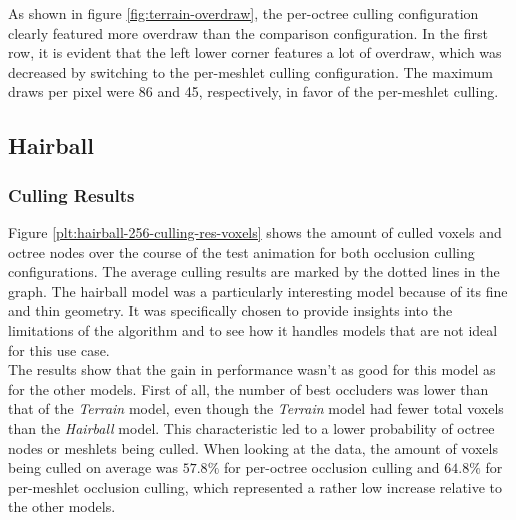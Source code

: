 \noindent
As shown in figure \ref{fig:terrain-overdraw}, the per-octree culling configuration clearly 
featured more overdraw than the comparison configuration. In the first row, it is evident that 
the left lower corner features a lot of overdraw, which was decreased by switching to the 
per-meshlet culling configuration. The maximum draws per pixel were 86 and 45, respectively, in 
favor of the per-meshlet culling.

\clearpage




\subsection*{Hairball}

\subsubsection*{Culling Results} \label{subsubsec-culling-results-hairball}

Figure \ref{plt:hairball-256-culling-res-voxels} shows the amount of culled voxels and octree nodes 
over the course of the test animation for both occlusion culling configurations. The average culling 
results are marked by the dotted lines in the graph. The hairball model was a particularly interesting 
model because of its fine and thin geometry. It was specifically chosen to provide insights into the 
limitations of the algorithm and to see how it handles models that are not ideal for this use case.\\

\noindent
The results show that the gain in performance wasn't as good for this model as for the other models.
First of all, the number of best occluders was lower than that of the \emph{Terrain} model, even though the 
\emph{Terrain} model had fewer total voxels than the \emph{Hairball} model. This characteristic led to 
a lower probability of octree nodes or meshlets being culled. When looking at the data, the amount of 
voxels being culled on average was $57.8\%$ for per-octree occlusion culling and $64.8\%$ for per-meshlet 
occlusion culling, which represented a rather low increase relative to the other models. 


